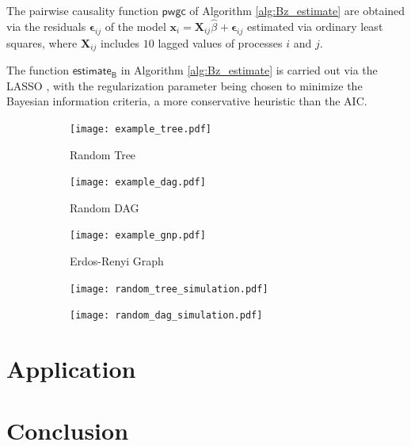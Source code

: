 \documentclass[12pt]{article}
\begin{document}
The pairwise causality function $\mathsf{pwgc}$ of Algorithm
\ref{alg:Bz_estimate} are obtained via the residuals
$\mathbf{\epsilon}_{ij}$ of the model
$\mathbf{x}_i = \mathbf{X}_{ij}\widehat{\beta_{}} +
\mathbf{\epsilon}_{ij}$ estimated via ordinary least squares, where
$\mathbf{X}_{ij}$ includes $10$ lagged values of processes $i$ and
$j$.

The function $\mathsf{estimate_B}$ in Algorithm \ref{alg:Bz_estimate}
is carried out via the LASSO \cite{tibshirani2015statistical}, with
the regularization parameter being chosen to minimize the Bayesian
information criteria, a more conservative heuristic than the AIC.

\begin{figure}
  \centering
  \caption{Simulation Results and Representitive Random Graph Topologies}
  \label{fig:simulation_results}

  \begin{subfigure}[b]{0.30\textwidth}
    \caption{Random Tree}
    \texttt{[image: example\_tree.pdf]}
  \end{subfigure}
  \begin{subfigure}[b]{0.30\textwidth}
    \caption{Random DAG}
    \texttt{[image: example\_dag.pdf]}
  \end{subfigure}
  \begin{subfigure}[b]{0.30\textwidth}
    \caption{Erdos-Renyi Graph}
    \texttt{[image: example\_gnp.pdf]}
  \end{subfigure}

  \begin{subfigure}[b]{0.30\textwidth}
    \texttt{[image: random\_tree\_simulation.pdf]}
  \end{subfigure}
  \begin{subfigure}[b]{0.30\textwidth}
    \texttt{[image: random\_dag\_simulation.pdf]}
  \end{subfigure}
  \begin{subfigure}[b]{0.30\textwidth}
    \missingfigure{}
  \end{subfigure}
\end{figure}

\section{Application}
\label{sec:application}
\section{Conclusion}
\label{sec:conclusion}

\printbibliography
\end{document}
